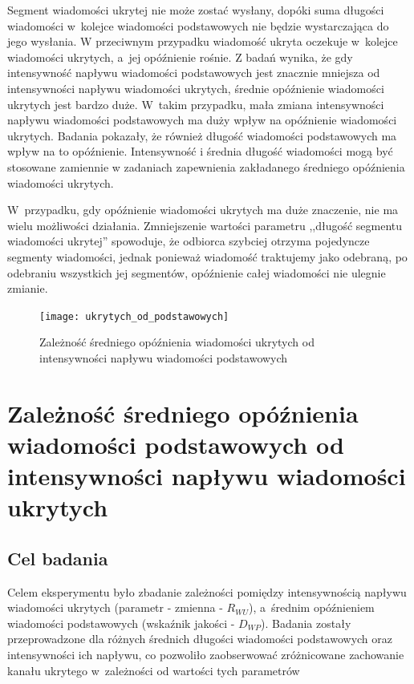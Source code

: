 \documentclass[a4paper, twoside, openright, 12pt]{report}
\begin{document}
            Segment wiadomości ukrytej nie może zostać wysłany, dopóki suma długości
            wiadomości w~kolejce wiadomości podstawowych nie będzie wystarczająca do jego wysłania.
            W przeciwnym przypadku wiadomość ukryta oczekuje w~kolejce wiadomości
            ukrytych, a~jej opóźnienie rośnie. Z badań wynika, że gdy intensywność
            napływu wiadomości podstawowych jest znacznie mniejsza od intensywności
            napływu wiadomości ukrytych, średnie opóźnienie wiadomości ukrytych jest
            bardzo duże. W~takim przypadku, mała zmiana intensywności napływu wiadomości
            podstawowych ma duży wpływ na opóźnienie wiadomości ukrytych. Badania
            pokazały, że również długość wiadomości podstawowych ma wpływ na to opóźnienie.
            Intensywność i średnia długość wiadomości mogą być stosowane zamiennie
            w zadaniach zapewnienia zakładanego średniego opóźnienia wiadomości ukrytych.

            W~przypadku, gdy opóźnienie wiadomości ukrytych ma duże znaczenie,
            nie ma wielu możliwości działania. Zmniejszenie wartości parametru ,,długość
            segmentu wiadomości ukrytej'' spowoduje, że odbiorca szybciej otrzyma
            pojedyncze segmenty wiadomości, jednak ponieważ wiadomość traktujemy jako odebraną,
            po odebraniu wszystkich jej segmentów, opóźnienie całej wiadomości
            nie ulegnie zmianie.

        \begin{figure}[h]
                \centering
                \texttt{[image: ukrytych\_od\_podstawowych]}
                \caption{Zależność średniego opóźnienia wiadomości ukrytych od
                    intensywności napływu wiadomości podstawowych}
                \label{OPOZNIENIEUKRYTYCHODPODSTAWOWYCH}
        \end{figure}

    \section{Zależność średniego opóźnienia wiadomości podstawowych od intensywności napływu wiadomości ukrytych} \label{OPOZNIENEPODSTAWOWYCHODUKRYTYCH}
        \subsection{Cel badania}
            Celem eksperymentu było zbadanie zależności pomiędzy intensywnością
            napływu wiadomości ukrytych (parametr - zmienna - \( R_{WU} \)), a~średnim opóźnieniem wiadomości podstawowych (wskaźnik jakości - \( D_{WP} \)).
            Badania zostały przeprowadzone dla różnych średnich długości wiadomości
            podstawowych oraz intensywności ich napływu, co pozwoliło zaobserwować
            zróżnicowane zachowanie kanału ukrytego w~zależności od wartości tych
            parametrów
\end{document}
